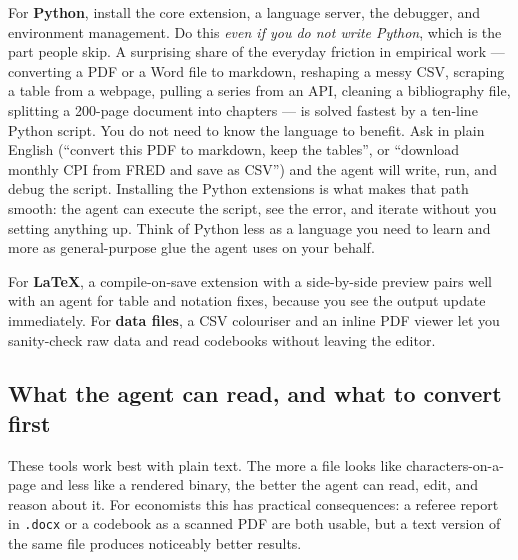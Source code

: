 \documentclass[11pt,a4paper]{article}
\newcommand{\code}[1]{\texttt{\small #1}}
\begin{document}
For \textbf{Python}, install the core extension, a language server, the debugger,
and environment management. Do this \emph{even if you do not write Python}, which is the part people skip. A surprising share of the everyday
friction in empirical work --- converting a PDF or a Word file to markdown,
reshaping a messy CSV, scraping a table from a webpage, pulling a series from an
API, cleaning a bibliography file, splitting a 200-page document into chapters
--- is solved fastest by a ten-line Python script. You do not need to know the
language to benefit. Ask in plain English (``convert this PDF to markdown, keep
the tables'', or ``download monthly CPI from FRED and save as CSV'') and the agent
will write, run, and debug the script. Installing the Python extensions is what
makes that path smooth: the agent can execute the script, see the error, and
iterate without you setting anything up. Think of Python less as a language you
need to learn and more as general-purpose glue the agent uses on your behalf.

For \textbf{LaTeX}, a compile-on-save extension with a side-by-side preview pairs
well with an agent for table and notation fixes, because you see the output
update immediately. For \textbf{data files}, a CSV colouriser and an inline PDF
viewer let you sanity-check raw data and read codebooks without leaving the
editor.

\subsection{What the agent can read, and what to convert first}

These tools work best with plain text. The more a file looks like
characters-on-a-page and less like a rendered binary, the better the agent can
read, edit, and reason about it. For economists this has practical consequences:
a referee report in \code{.docx} or a codebook as a scanned PDF are both usable,
but a text version of the same file produces noticeably better results.
\end{document}
